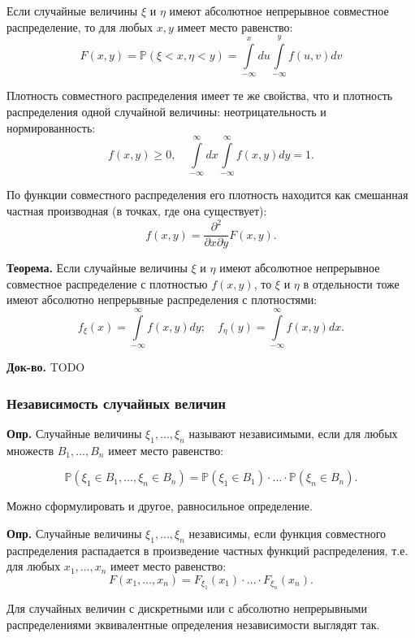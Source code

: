 \documentclass[oneside,final,14pt]{extreport}
\newcommand\mydef{{\bf Опр.}}
\newcommand\myth{{\bf Теорема.}}
\newcommand\myqed{{\bf Док-во.}}
\theoremstyle{definition}
\begin{document}
Если случайные величины $\xi$ и $\eta$ имеют абсолютное непрерывное совместное распределение, то для любых $x, y$ имеет место равенство:
\begin{equation}F(x, y)=\mathbb{P}(\xi<x, \eta<y)=\int\limits_{-\infty}^{x} d u \int\limits_{-\infty}^{y} f(u, v) d v\end{equation}

Плотность совместного распределения имеет те же свойства, что и плотность распределения одной случайной величины: неотрицательность и нормированность:
$$f(x, y) \geqslant 0, \quad \int\limits_{-\infty}^{\infty} d x \int\limits_{-\infty}^{\infty} f(x, y) d y=1.$$

По функции совместного распределения его плотность находится как смешанная частная производная (в точках, где она существует):
$$f(x, y)=\frac{\partial^{2}}{\partial x \partial y} F(x, y).$$

\myth{} Если случайные величины $\xi$ и $\eta$ имеют абсолютное непрерывное совместное распределение с плотностью $f(x,y)$, то $\xi$ и $\eta$ в отдельности тоже имеют абсолютно непрерывные распределения с плотностями:
$$f_{\xi}(x)=\int\limits_{-\infty}^{\infty} f(x, y) d y ; \quad f_{\eta}(y)=\int\limits_{-\infty}^{\infty} f(x, y) d x.$$

\myqed{} TODO

\subsubsection{Независимость случайных величин}

\mydef{} Случайные величины $\xi_1, ..., \xi_n$ называют независимыми, если для любых множеств $B_1, ..., B_n$ имеет место равенство:

$$\mathbb{P}\left(\xi_{1} \in B_{1}, \ldots, \xi_{n} \in B_{n}\right)=\mathbb{P}\left(\xi_{1} \in B_{1}\right) \cdot \ldots \cdot \mathbb{P}\left(\xi_{n} \in B_{n}\right).$$

Можно сформулировать и другое, равносильное определение.

\mydef{} Случайные величины $\xi_1, ..., \xi_n$ независимы, если функция совместного распределения распадается в произведение частных функций распределения, т.е. для любых $x_1, ..., x_n$ имеет место равенство:
$$F\left(x_{1}, \ldots, x_{n}\right)=F_{\xi_{1}}\left(x_{1}\right) \cdot \ldots \cdot F_{\xi_{n}}\left(x_{n}\right).$$

Для случайных величин с дискретными или с абсолютно непрерывными
распределениями эквивалентные определения независимости выглядят так.
\end{document}
